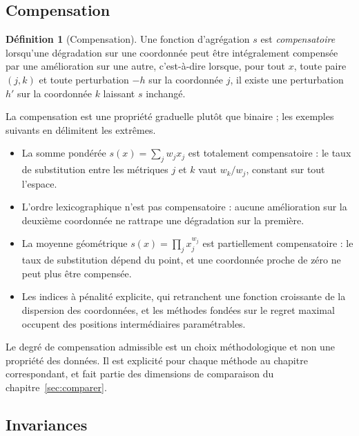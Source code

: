 \documentclass[11pt,a4paper]{article}
\theoremstyle{definition}
\newtheorem{definition}{Définition}[section]
\theoremstyle{remark}
\begin{document}
\subsection{Compensation}

\medskip

\begin{definition}[Compensation]
  \label{def:compensation}
  Une fonction d'agrégation $s$ est \emph{compensatoire} lorsqu'une dégradation sur une
  coordonnée peut être intégralement compensée par une amélioration sur une autre,
  c'est-à-dire lorsque, pour tout $x$, toute paire $(j,k)$ et toute perturbation
  $-h$ sur la coordonnée $j$, il existe une perturbation $h'$ sur la coordonnée $k$
  laissant $s$ inchangé.
\end{definition}

\bigskip

La compensation est une propriété graduelle plutôt que binaire ; les exemples suivants en
délimitent les extrêmes.

\medskip

\begin{itemize}[nosep,leftmargin=1.4em]
  \item La somme pondérée $s(x) = \sum_j w_j x_j$ est totalement compensatoire : le taux
  de substitution entre les métriques $j$ et $k$ vaut $w_k/w_j$, constant sur tout
  l'espace.
  \item L'ordre lexicographique n'est pas compensatoire : aucune amélioration sur la
  deuxième coordonnée ne rattrape une dégradation sur la première.
  \item La moyenne géométrique $s(x) = \prod_j x_j^{w_j}$ est partiellement
  compensatoire : le taux de substitution dépend du point, et une coordonnée proche de
  zéro ne peut plus être compensée.
  \item Les indices à pénalité explicite, qui retranchent une fonction croissante de la
  dispersion des coordonnées, et les méthodes fondées sur le regret maximal occupent des
  positions intermédiaires paramétrables.
\end{itemize}

\bigskip

Le degré de compensation admissible est un choix méthodologique et non une propriété des
données. Il est explicité pour chaque méthode au chapitre correspondant, et fait partie
des dimensions de comparaison du chapitre~\ref{sec:comparer}.

\bigskip

\subsection{Invariances}
\end{document}
